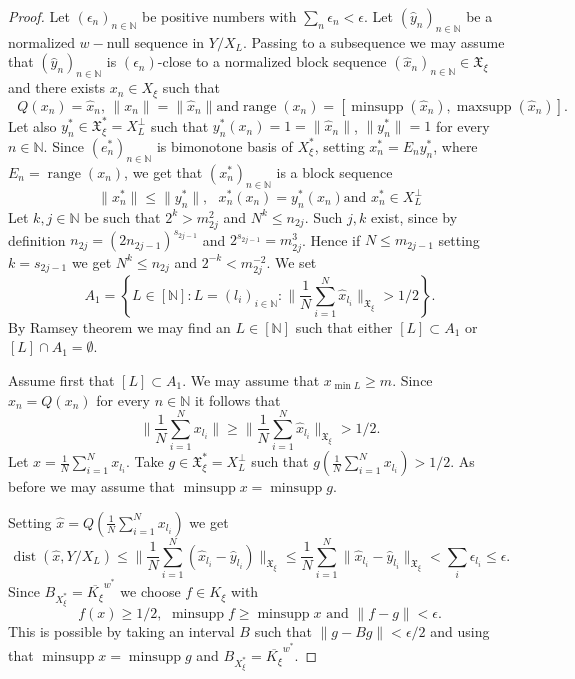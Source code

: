 \documentclass[a4paper]{amsart}
\theoremstyle{plain}
\newcommand{\N}{\mathbb{N}}
\newcommand{\e}{\epsilon}
\newcommand{\norm}[1][\cdot]{\lVert #1\rVert}
\newcommand{\hxn}[1][x]{(\widehat{#1}_{n})_{n\in\N}}
\newcommand{\hyn}{(\hat{y}_{n})_{n\in\N}}
\DeclareMathOperator{\minsupp}{minsupp}
\DeclareMathOperator{\maxsupp}{maxsupp}
\DeclareMathOperator{\ran}{range}
\DeclareMathOperator{\dist}{dist}
\begin{document}
\begin{proof}
Let $(\e_{n})_{n\in\N}$ be positive numbers with $\sum_{n}\e_{n}<\e$.
Let $\hyn$ be a normalized $w-$null sequence in $Y/X_{L}$. Passing
to  a subsequence we may assume that  $\hyn$ is $(\e_n)$-close to
a normalized block sequence $\hxn\in \mathfrak{X}_{\xi}$  and there
exists $x_{n}\in X_{\xi}$ such that
$$
\mbox{ $Q(x_n)=\widehat{x}_n$, $\norm[x_n]=\norm[\widehat{x}_{n}]$
and
$\ran(x_n)=[\minsupp(\widehat{x}_{n}),\maxsupp(\widehat{x}_{n})]$}.
$$
Let also $y_{n}^{*}\in \mathfrak{X}_{\xi}^{*}=X_{L}^{\perp}$ such
that $y_{n}^{*}(x_{n})=1=\norm[\widehat{x}_{n}]$,
$\norm[y_n^{*}]=1$ for every  $n\in\N$. Since
$(e_n^{*})_{n\in\N}$ is bimonotone basis of $X_{\xi}^{*}$, setting
$x_{n}^{*}=E_{n}y_{n}^{*}$, where $E_{n}=\ran(x_n)$, we get that
$(x_{n}^{*})_{n\in\N}$ is a block sequence
$$
\mbox{$\norm[x_n^{*}]\leq \norm[y_n^{*}],\,\,\,\,x_{n}^{*}(x_{n})=y_{n}^{*}(x_n)$
and  $x_{n}^{*}\in X_{L}^{\perp}$}
$$
Let $k,j\in\N$ be such that $2^k>m^2_{2j}$ and $N^k\leq n_{2j}$. Such $j,k$ exist, since
by definition $n_{2j}=(2n_{2j-1})^{s_{2j-1}}$ and $2^{s_{2j-1}}=m_{2j}^{3}$. Hence if
$N\leq m_{2j-1}$ setting $k=s_{2j-1}$ we get  $N^k\leq n_{2j}$ and  $2^{-k}<
m^{-2}_{2j}$. We set
$$
A_{1}=\left\{L\in [\N]: L=(l_{i})_{i\in\N}:
\|\frac{1}{N}\sum_{i=1}^{N}\widehat{x}_{l_{i}}\|_{\mathfrak{X}_\xi}>1/2\right\}.
$$
By Ramsey theorem we may find an  $L\in[\N]$ such that either $[L]\subset A_{1}$ or $[L]\cap A_1=\emptyset$.


Assume first that $[L]\subset A_{1}$. We may assume that $x_{\min L}\geq m$.
Since  $\widehat{x}_{n}=Q(x_n)$ for every $n\in\N$ it follows that
$$
\|\frac{1}{N}\sum_{i=1}^{N}x_{l_{i}}\|\geq
\|\frac{1}{N}\sum_{i=1}^{N}\widehat{x}_{l_{i}}\|_{\mathfrak{X}_\xi}> 1/2.
$$
Let $x=\frac{1}{N}\sum_{i=1}^{N}x_{l_{i}}$. Take $g\in
\mathfrak{X}_{\xi}^{*}=X_{L}^{\perp}$ such that
$g(\frac{1}{N}\sum_{i=1}^{N}x_{l_{i}})>1/2$. As before we may
assume that  $\minsupp x=\minsupp g$.

Setting  $\widehat{x}=Q(\frac{1}{N}\sum_{i=1}^{N}x_{l_{i}})$ we get
$$
\dist(\widehat{x}, Y/X_{L})\leq
\|\frac{1}{N}\sum_{i=1}^{N}(\widehat{x}_{l_{i}}-\widehat{y}_{l_i})\|_{\mathfrak{X}_{\xi}}\leq
\frac{1}{N}\sum_{i=1}^{N}\norm[\widehat{x}_{l_{i}}-\widehat{y}_{l_i}]_{\mathfrak{X}_{\xi}}<\sum_{i}\e_{l_i}\leq\e.
$$
Since  $B_{X_{\xi}^{*}}=\overline{K_{\xi}}^{w^{*}}$ we choose $f\in K_{\xi}$ with
$$
f(x)\geq 1/2,\,\,\minsupp f\geq\minsupp x\,\,\mbox{and}\,\,\norm[f-g]<\e.
$$
This is possible by taking an interval $B$ such that $\norm[g-Bg]<\e/2$ and using that
$\minsupp x=\minsupp g$ and $B_{X_{\xi}^{*}}=\overline{K_{\xi}}^{w^{*}}$.


\end{proof}
\end{document}
